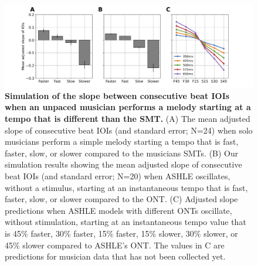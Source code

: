 \documentclass{report}
\begin{document}
\begin{figure}
    \centering
    \includegraphics[width=1.0\textwidth]{figures/fig3_3.png}
    \caption[Simulation of the slope between consecutive beat IOIs when an unpaced musician performs a melody starting at a tempo that is different than the SMT]{\textbf{Simulation of the slope between consecutive beat IOIs when an unpaced musician performs a melody starting at a tempo that is different than the SMT.} (A) The mean adjusted slope of consecutive beat IOIs (and standard error; N=24) when solo musicians perform a simple melody starting a tempo that is fast, faster, slow, or slower compared to the musicians SMTs. (B) Our simulation results showing the mean adjusted slope of consecutive beat IOIs (and standard error; N=20) when ASHLE oscillates, without a stimulus, starting at an instantaneous tempo that is fast, faster, slow, or slower compared to the ONT. (C) Adjusted slope predictions when ASHLE models with different ONTs oscillate, without stimulation, starting at an instantaneous tempo value that is 45\% faster, 30\% faster, 15\% faster, 15\% slower, 30\% slower, or 45\% slower compared to ASHLE's ONT. The values in C are predictions for musician data that has not been collected yet.}
    \label{f3_3}
\end{figure}
\end{document}
